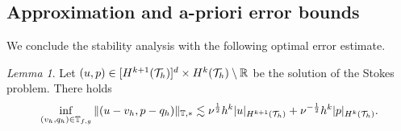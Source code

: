 \documentclass[sn-mathphys,Numbered]{sn-jnl}%
\theoremstyle{remark}%
\newtheorem{lemma}[theorem]{Lemma}
\theoremstyle{definition}%
\begin{document}
\subsection{Approximation and a-priori error bounds}

We conclude the stability analysis with the following optimal error estimate. 
\begin{lemma}
Let $(u,p) \in [H^{k+1}({\mathcal{T}_h})]^d \times H^{k}({\mathcal{T}_h}) \setminus \mathbb{R}$ be the solution of the Stokes problem.
  There holds
  \begin{equation} \label{eq:approx}
    \inf_{(v_h,q_h) \in \mathbb{T}_{f,g}} \Vert (u-v_h,p-q_h) \Vert_{\mathbb{T},\ast} \lesssim
    \nu^{\frac12} h^{k} \vert  u \vert_{H^{k+1}({\mathcal{T}_h})} + \nu^{-\frac12} h^{k} \vert p \vert_{H^{k}({\mathcal{T}_h})}.
  \end{equation}
\end{lemma}
\end{document}

